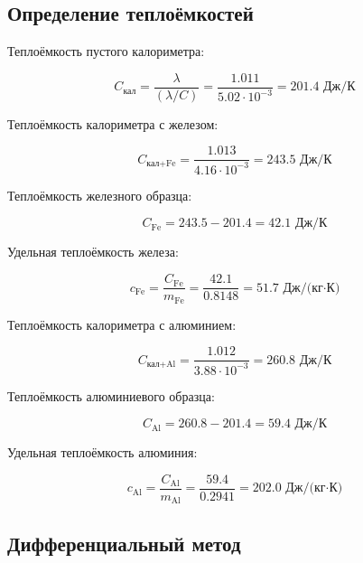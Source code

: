 \documentclass{article}
\begin{document}
\subsection*{Определение теплоёмкостей}

Теплоёмкость пустого калориметра:

\begin{equation}
C_{\text{кал}} = \frac{\lambda}{(\lambda/C)} = \frac{1.011}{5.02 \cdot 10^{-3}} = 201.4 \text{ Дж/К}
\end{equation}

Теплоёмкость калориметра с железом:

\begin{equation}
C_{\text{кал+Fe}} = \frac{1.013}{4.16 \cdot 10^{-3}} = 243.5 \text{ Дж/К}
\end{equation}

Теплоёмкость железного образца:

\begin{equation}
C_{\text{Fe}} = 243.5 - 201.4 = 42.1 \text{ Дж/К}
\end{equation}

Удельная теплоёмкость железа:

\begin{equation}
c_{\text{Fe}} = \frac{C_{\text{Fe}}}{m_{\text{Fe}}} = \frac{42.1}{0.8148} = 51.7 \text{ Дж/(кг·К)}
\end{equation}

Теплоёмкость калориметра с алюминием:

\begin{equation}
C_{\text{кал+Al}} = \frac{1.012}{3.88 \cdot 10^{-3}} = 260.8 \text{ Дж/К}
\end{equation}

Теплоёмкость алюминиевого образца:

\begin{equation}
C_{\text{Al}} = 260.8 - 201.4 = 59.4 \text{ Дж/К}
\end{equation}

Удельная теплоёмкость алюминия:

\begin{equation}
c_{\text{Al}} = \frac{C_{\text{Al}}}{m_{\text{Al}}} = \frac{59.4}{0.2941} = 202.0 \text{ Дж/(кг·К)}
\end{equation}

\subsection*{Дифференциальный метод}
\end{document}
